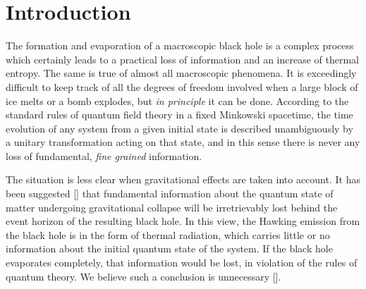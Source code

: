 \REF{}

\REF{}

\REF{}

\REF{}

\REF{}

\REF{}

\REF{}

%
%

%
%
\chapter{Introduction}

The formation and evaporation of a macroscopic black hole is a
complex process which certainly leads to a practical loss of
information and an increase of thermal entropy.  The same is true of
almost all macroscopic phenomena.  It is exceedingly difficult to
keep track of all the degrees of freedom involved when a large block
of ice melts or a bomb explodes, but {\it in principle\/} it can be
done.  According to the standard rules of quantum field theory in a
fixed Minkowski spacetime, the time evolution of any system from a
given initial state is described unambiguously by a unitary
transformation acting on that state, and in this sense there is never
any loss of fundamental, {\it fine grained\/} information.

The situation is less clear when gravitational effects are taken into
account.  It has been suggested [\hawk] that fundamental information
about the quantum state of matter undergoing gravitational collapse
will be irretrievably lost behind the event horizon of the resulting
black hole.  In this view, the Hawking emission from the black hole
is in the form of thermal radiation, which carries little or no
information about the initial quantum state of the system.  If the
black hole evaporates completely, that information would be lost, in
violation of the rules of quantum theory.  We believe such a
conclusion is unnecessary [\dpage].

